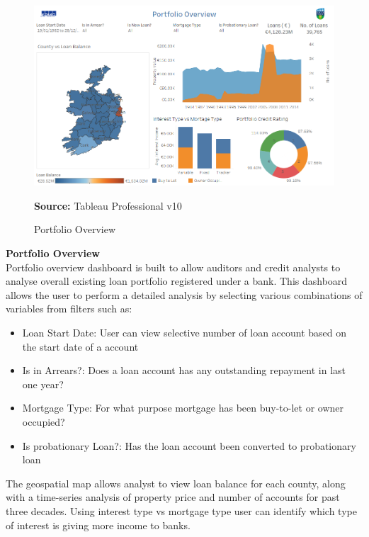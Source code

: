 \begin{center}
\begin{figure}[!htb]
\includegraphics[width=\textwidth]{Overview.png}
\centering
\caption{Portfolio Overview}{\textbf{Source:} Tableau Professional v10}
\label{fig:overview}
\end{figure}
\end{center}


\textbf{Portfolio Overview}\\
Portfolio overview dashboard is built to allow auditors and credit analysts to analyse overall existing loan portfolio registered under a bank. This dashboard allows the user to perform a detailed analysis by selecting various combinations of variables from filters such as:
\begin{itemize}
\item Loan Start Date: User can view selective number of loan account based on the start date of a account
\item Is in Arrears?: Does a loan account has any outstanding repayment in last one year?
\item Mortgage Type: For what purpose mortgage has been buy-to-let or owner occupied?
\item Is probationary Loan?: Has the loan account been converted to probationary loan
\end{itemize}

The geospatial map allows analyst to view loan balance for each county, along with a time-series analysis of property price and number of accounts for past three decades. Using interest type vs mortgage type user can identify which type of interest is giving more income to banks.


